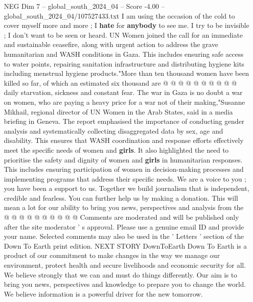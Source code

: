 \begin{textsample}{NEG Dim 7 – global\_south\_2024\_04 – Score -4.00 – global\_south\_2024\_04/107527433.txt}
I am using the occasion of the cold to cover myself more and more ; I \textbf{hate} for \textbf{anybody} to see me.
I try to be invisible ; I don't want to be seen or heard.
UN Women joined the call for an immediate and sustainable ceasefire, along with urgent action to address the grave humanitarian and WASH conditions in Gaza.
This includes ensuring safe access to water points, repairing sanitation infrastructure and distributing hygiene kits including menstrual hygiene products."More than ten thousand women have been killed so far, of which an estimated six thousand are @ @ @ @ @ @ @ @ @ @ daily starvation, sickness and constant fear.
The war in Gaza is no doubt a war on women, who are paying a heavy price for a war not of their making,"Susanne Mikhail, regional director of UN Women in the Arab States, said in a media briefing in Geneva.
The report emphasised the importance of conducting gender analysis and systematically collecting disaggregated data by sex, age and disability.
This ensures that WASH coordination and response efforts effectively meet the specific needs of women and \textbf{girls}.
It also highlighted the need to prioritise the safety and dignity of women and \textbf{girls} in humanitarian responses.
This includes ensuring participation of women in decision-making processes and implementing programs that address their specific needs.
We are a voice to you ; you have been a support to us.
Together we build journalism that is independent, credible and fearless.
You can further help us by making a donation.
This will mean a lot for our ability to bring you news, perspectives and analysis from the @ @ @ @ @ @ @ @ @ @ Comments are moderated and will be published only after the site moderator ' s approval.
Please use a genuine email ID and provide your name.
Selected comments may also be used in the ' Letters ' section of the Down To Earth print edition.
NEXT STORY DownToEarth Down To Earth is a product of our commitment to make changes in the way we manage our environment, protect health and secure livelihoods and economic security for all.
We believe strongly that we can and must do things differently.
Our aim is to bring you news, perspectives and knowledge to prepare you to change the world.
We believe information is a powerful driver for the new tomorrow.

\end{textsample}
